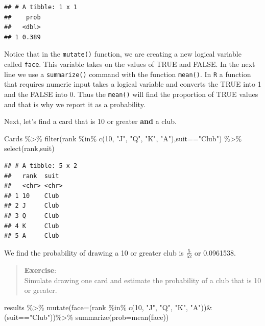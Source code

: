 \documentclass[
]{book}
\newenvironment{Shaded}{\begin{snugshade}}{\end{snugshade}}
\newcommand{\AttributeTok}[1]{\textcolor[rgb]{0.77,0.63,0.00}{#1}}
\newcommand{\DecValTok}[1]{\textcolor[rgb]{0.00,0.00,0.81}{#1}}
\newcommand{\FunctionTok}[1]{\textcolor[rgb]{0.00,0.00,0.00}{#1}}
\newcommand{\NormalTok}[1]{#1}
\newcommand{\SpecialCharTok}[1]{\textcolor[rgb]{0.00,0.00,0.00}{#1}}
\newcommand{\StringTok}[1]{\textcolor[rgb]{0.31,0.60,0.02}{#1}}
\begin{document}
\begin{verbatim}
## # A tibble: 1 x 1
##    prob
##   <dbl>
## 1 0.389
\end{verbatim}

Notice that in the \texttt{mutate()} function, we are creating a new logical variable called \texttt{face}. This variable takes on the values of TRUE and FALSE. In the next line we use a \texttt{summarize()} command with the function \texttt{mean()}. In \texttt{R} a function that requires numeric input takes a logical variable and converts the TRUE into 1 and the FALSE into 0. Thus the \texttt{mean()} will find the proportion of TRUE values and that is why we report it as a probability.

Next, let's find a card that is 10 or greater \textbf{and} a club.

\begin{Shaded}
\begin{Highlighting}[]
\NormalTok{Cards }\SpecialCharTok{\%\textgreater{}\%}
  \FunctionTok{filter}\NormalTok{(rank }\SpecialCharTok{\%in\%} \FunctionTok{c}\NormalTok{(}\DecValTok{10}\NormalTok{, }\StringTok{"J"}\NormalTok{, }\StringTok{"Q"}\NormalTok{, }\StringTok{"K"}\NormalTok{, }\StringTok{"A"}\NormalTok{),suit}\SpecialCharTok{==}\StringTok{"Club"}\NormalTok{) }\SpecialCharTok{\%\textgreater{}\%}
  \FunctionTok{select}\NormalTok{(rank,suit)}
\end{Highlighting}
\end{Shaded}

\begin{verbatim}
## # A tibble: 5 x 2
##   rank  suit 
##   <chr> <chr>
## 1 10    Club 
## 2 J     Club 
## 3 Q     Club 
## 4 K     Club 
## 5 A     Club
\end{verbatim}

We find the probability of drawing a 10 or greater club is \(\frac{5}{52}\) or 0.0961538.

\begin{quote}
\textbf{Exercise}:\\
Simulate drawing one card and estimate the probability of a club that is 10 or greater.
\end{quote}

\begin{Shaded}
\begin{Highlighting}[]
\NormalTok{results }\SpecialCharTok{\%\textgreater{}\%}
  \FunctionTok{mutate}\NormalTok{(}\AttributeTok{face=}\NormalTok{(rank }\SpecialCharTok{\%in\%} \FunctionTok{c}\NormalTok{(}\DecValTok{10}\NormalTok{, }\StringTok{"J"}\NormalTok{, }\StringTok{"Q"}\NormalTok{, }\StringTok{"K"}\NormalTok{, }\StringTok{"A"}\NormalTok{))}\SpecialCharTok{\&}\NormalTok{(suit}\SpecialCharTok{==}\StringTok{"Club"}\NormalTok{))}\SpecialCharTok{\%\textgreater{}\%}
  \FunctionTok{summarize}\NormalTok{(}\AttributeTok{prob=}\FunctionTok{mean}\NormalTok{(face))}
\end{Highlighting}
\end{Shaded}
\end{document}
